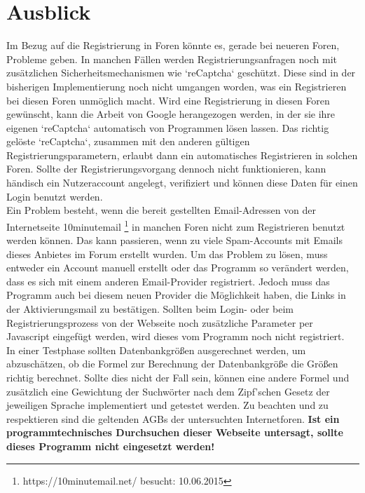 \section{Ausblick}
Im Bezug auf die Registrierung in Foren könnte es, gerade bei neueren Foren, Probleme geben. In manchen Fällen werden Registrierungsanfragen noch mit zusätzlichen Sicherheitsmechanismen wie `reCaptcha` geschützt. Diese sind in der bisherigen Implementierung noch nicht umgangen worden, was ein Registrieren bei diesen Foren unmöglich macht. Wird eine Registrierung in diesen Foren gewünscht, kann die Arbeit von Google herangezogen werden, in der sie ihre eigenen `reCaptcha` automatisch von Programmen lösen lassen\cite{goodfellow2013multi}. Das richtig gelöste `reCaptcha`, zusammen mit den anderen gültigen Registrierungsparametern, erlaubt dann ein automatisches Registrieren in solchen Foren. Sollte der Registrierungsvorgang dennoch nicht funktionieren, kann händisch ein Nutzeraccount angelegt, verifiziert und können diese Daten für einen Login benutzt werden.\\
Ein Problem besteht, wenn die bereit gestellten Email-Adressen von der Internetseite 10minutemail \footnote{https://10minutemail.net/ besucht: 10.06.2015} in manchen Foren nicht zum Registrieren benutzt werden können. Das kann passieren, wenn zu viele Spam-Accounts mit Emails dieses Anbietes im Forum erstellt wurden. Um das Problem zu lösen, muss entweder ein Account manuell erstellt oder das Programm so verändert werden, dass es sich mit einem anderen Email-Provider registriert. Jedoch muss das Programm auch bei diesem neuen Provider die Möglichkeit haben, die Links in der Aktivierungsmail zu bestätigen.
Sollten beim Login- oder beim Registrierungsprozess von der Webseite noch zusätzliche Parameter per Javascript eingefügt werden, wird dieses vom Programm noch nicht registriert.\\
In einer Testphase sollten Datenbankgrößen ausgerechnet werden, um abzuschätzen, ob die Formel zur Berechnung der Datenbankgröße die Größen richtig berechnet. Sollte dies nicht der Fall sein, können eine andere Formel und zusätzlich eine Gewichtung der Suchwörter nach dem Zipf'schen Gesetz \cite{leopold2002zipfsche} der jeweiligen Sprache implementiert und getestet werden\cite{jiang2009selectivity}.
Zu beachten und zu respektieren sind die geltenden AGBs der untersuchten Internetforen. \textbf{Ist ein programmtechnisches Durchsuchen dieser Webseite untersagt, sollte dieses Programm nicht eingesetzt werden!}

